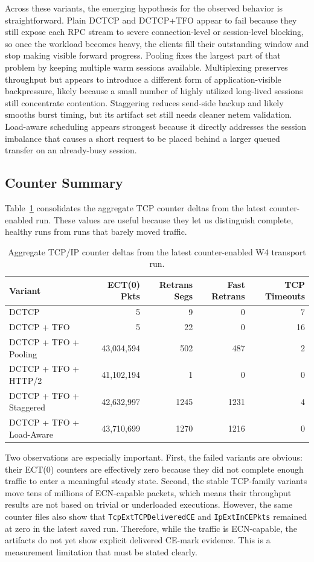 \documentclass[11pt]{article}
\begin{document}
Across these variants, the emerging hypothesis for the observed behavior is straightforward. Plain DCTCP and DCTCP+TFO appear to fail because they still expose each RPC stream to severe connection-level or session-level blocking, so once the workload becomes heavy, the clients fill their outstanding window and stop making visible forward progress. Pooling fixes the largest part of that problem by keeping multiple warm sessions available. Multiplexing preserves throughput but appears to introduce a different form of application-visible backpressure, likely because a small number of highly utilized long-lived sessions still concentrate contention. Staggering reduces send-side backup and likely smooths burst timing, but its artifact set still needs cleaner netem validation. Load-aware scheduling appears strongest because it directly addresses the session imbalance that causes a short request to be placed behind a larger queued transfer on an already-busy session.

\subsection{Counter Summary}

Table~\ref{tab:counters} consolidates the aggregate TCP counter deltas from the latest counter-enabled run. These values are useful because they let us distinguish complete, healthy runs from runs that barely moved traffic.

\begin{table}[H]
\centering
\caption{Aggregate TCP/IP counter deltas from the latest counter-enabled W4 transport run.}
\label{tab:counters}
\begin{tabular}{lrrrr}
\toprule
Variant & ECT(0) Pkts & Retrans Segs & Fast Retrans & TCP Timeouts \\
\midrule
DCTCP & 5 & 9 & 0 & 7 \\
DCTCP + TFO & 5 & 22 & 0 & 16 \\
DCTCP + TFO + Pooling & 43,034,594 & 502 & 487 & 2 \\
DCTCP + TFO + HTTP/2 & 41,102,194 & 1 & 0 & 0 \\
DCTCP + TFO + Staggered & 42,632,997 & 1245 & 1231 & 4 \\
DCTCP + TFO + Load-Aware & 43,710,699 & 1270 & 1216 & 0 \\
\bottomrule
\end{tabular}
\end{table}

Two observations are especially important. First, the failed variants are obvious: their ECT(0) counters are effectively zero because they did not complete enough traffic to enter a meaningful steady state. Second, the stable TCP-family variants move tens of millions of ECN-capable packets, which means their throughput results are not based on trivial or underloaded executions. However, the same counter files also show that \texttt{TcpExtTCPDeliveredCE} and \texttt{IpExtInCEPkts} remained at zero in the latest saved run. Therefore, while the traffic is ECN-capable, the artifacts do not yet show explicit delivered CE-mark evidence. This is a measurement limitation that must be stated clearly.
\end{document}
